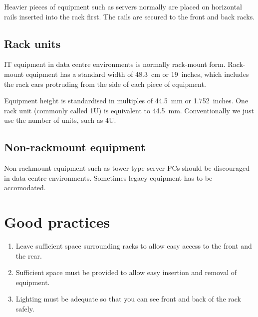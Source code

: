 \documentclass{pgnotes}
\begin{document}
Heavier pieces of equipment such as servers normally are placed on horizontal rails inserted into the rack first.
The rails are secured to the front and back racks.

\subsection{Rack units}

IT equipment in data centre environments is normally rack-mount form.
Rack-mount equipment has a standard width of \SI{48.3}{\centi\metre} or 19~inches, which includes the rack ears protruding from the side of each piece of equipment.

Equipment height is standardised in multiples of \SI{44.5}{\milli\metre} or 1.752~inches.
One rack unit (commonly called 1U) is equivalent to \SI{44.5}{\milli\metre}.
Conventionally we just use the number of units, such as 4U.


\subsection{Non-rackmount equipment}

Non-rackmount equipment such as tower-type server PCs should be discouraged in data centre environments.
Sometimes legacy equipment has to be accomodated.

\section{Good practices}

\begin{enumerate}

\item Leave sufficient space surrounding racks to allow easy access to the front and the rear.

\item Sufficient space must be provided to allow easy insertion and removal of equipment.

\item Lighting must be adequate so that you can see front and back of the rack safely.

\end{enumerate}
\end{document}

